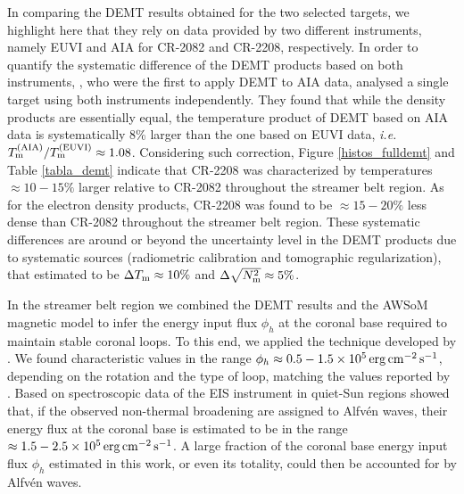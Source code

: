 \documentclass[namedreferences]{solarphysics}
\newcommand{\cm}{{\rm cm}}
\newcommand{\cminvs}{\cm^{-2}}
\newcommand{\erg}{{\rm erg}}
\newcommand{\s}{{\rm s}}
\newcommand{\Tm}{T_{\rm m}}
\newcommand{\Nsqm}{N^2_{{\rm m}}}
\newcommand{\sqravgN}{\sqrt{\Nsqm}}
\def\diego#1{\textcolor{red}{#1}}
\begin{document}
\begin{article}
In comparing the DEMT results obtained for the two selected targets, {we highlight here that} they rely on data provided by two different instruments, {namely EUVI and AIA for CR-2082 and CR-2208, respectively.} In order to quantify the systematic difference of the DEMT products based on both instruments, \citet{nuevo_2015}, who were the first to apply DEMT to AIA data, {analysed} a single target using both instruments independently. They found that while the density {products are} essentially equal, the temperature product of DEMT based on AIA data is systematically 8\% larger than the one based on EUVI data, \textit{i.e.} $\Tm^{\rm(AIA)}/\Tm^{\rm(EUVI)} \approx 1.08$. Considering such correction, Figure \ref{histos_fulldemt} and Table \ref{tabla_demt} indicate that CR-2208 was {characterized by temperatures $\approx 10-15\%$ larger relative to CR-2082} throughout the streamer belt region. As for the electron density products, CR-2208 was found to be $\approx 15-20\%$ less dense than CR-2082 throughout the streamer belt region. These systematic differences are {around or beyond the uncertainty level in the DEMT products due to systematic sources (radiometric calibration and tomographic regularization), that \citet{lloveras_2017} {estimated to be $\Delta\Tm\approx 10\%$ and $\Delta\sqravgN\approx 5\%$}.}





{In the streamer belt region we combined the DEMT results and the AWSoM magnetic model to infer the energy input flux $\phi_h$ at the coronal base required to maintain stable coronal loops. To this end, we applied the technique developed by \citet{maccormack_2017}. We found characteristic values in the range $\phi_h\approx 0.5-1.5 \times 10^5\,\erg\,\cminvs\,\s^{-1}$, depending on the rotation and the type of {loop, matching the values reported by} \citet{maccormack_2017}. Based on spectroscopic data of the EIS instrument in quiet-Sun regions \citet{hahn_2014} showed that, if the observed non-thermal broadening are assigned to Alfvén waves, their energy flux at the coronal base is estimated to be in the range $\approx 1.5-2.5\times 10^5\,\erg\,\cminvs\,\s^{-1}$. A large fraction of the coronal base energy input flux $\phi_h$ estimated in this work, or even its totality, could then be accounted for by Alfvén waves.}


\end{article}
\end{document}
